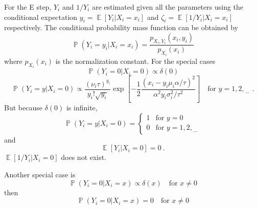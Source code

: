 \documentclass[12pt]{report}
\DeclareMathOperator{\expectation}{\mathbb{E}}
\DeclareMathOperator{\prob}{\mathbb{P}}
\newcommand{\dotdotdot}{_{\phantom{.}\cdots}}
\begin{document}
For the E step, $Y_i$ and $1/Y_i$ are estimated given all the parameters using the conditional expectation $y_i=\expectation\left[Y_i|X_i=x_i\right]$ and $\zeta_i=\expectation\left[1/Y_i|X_i=x_i\right]$ respectively. The conditional probability mass function can be obtained by
\begin{equation}
\prob\left(Y_i=y_i|X_i=x_i\right)=\frac{p_{X_i,Y_i}\left(x_i,y_i\right)}{p_{X_i}(x_i)}
\end{equation}
where $p_{X_i}(x_i)$ is the normalization constant.
For the special cases
\begin{equation}
\prob\left(Y_i=0|X_i=0\right) \propto \delta(0)
\end{equation}
\begin{equation}
\prob\left(Y_i=y|X_i=0\right) \propto
\dfrac{(\nu_i\tau)^{y_i}}{y_i!\sqrt{y_i}}
\exp\left[-\dfrac{1}{2}\dfrac{\left(x_i-y_i\mu_i\alpha/\tau\right)^2}{\alpha^2y_i\sigma_i^2/\tau^2}\right]
\quad \text{for }y=1,2,\dotdotdot \ .
\end{equation}
But because $\delta(0)$ is infinite,
\begin{equation}
\prob\left(Y_i=y|X_i=0\right) =
\begin{cases}
1 & \text{for }y=0
\\
0 & \text{for }y=1,2,\dotdotdot
\end{cases}
\end{equation}
and
\begin{equation}
\expectation[Y_i|X_i=0] = 0 \ .
\end{equation}
$\expectation[1/Y_i|X_i=0]$ does not exist.

Another special case is
\begin{equation}
\prob\left(Y_i=0|X_i=x\right) \propto \delta(x) \quad \text{for }x\neq0
\end{equation}
then
\begin{equation}
\prob\left(Y_i=0|X_i=x\right) = 0 \quad \text{for }x\neq0
\end{equation}
\end{document}

